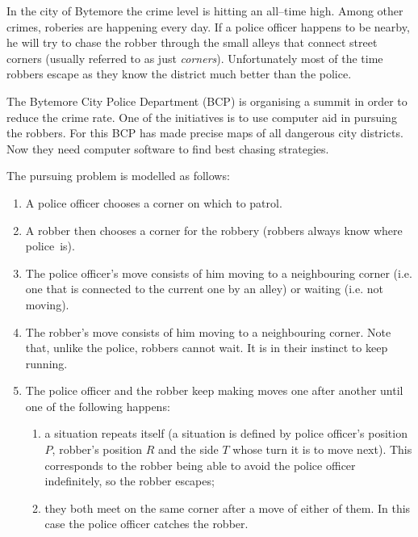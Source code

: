 \documentclass{boi2014}
\begin{document}
    In the city of Bytemore the crime level is hitting an all--time high.  Among
    other crimes, roberies are happening every day.  If a police officer happens
    to be nearby, he will try to chase the robber through the small alleys that
    connect street corners (usually referred to as just \emph{corners}).
    Unfortunately most of the time robbers escape as they know the district much
    better than the police.

    The Bytemore City Police Department (BCP) is organising a summit in order to
    reduce the crime rate. One of the initiatives is to use computer aid in
    pursuing the robbers. For this BCP has made precise maps of all dangerous
    city districts. Now they need computer software to find best chasing
    strategies.

    The pursuing problem is modelled as follows:
    \begin{enumerate}
        \item A police officer chooses a corner on which to patrol.
        \item A robber then chooses a corner for the robbery (robbers always
        know where police~is).
        \item The police officer's move consists of him moving to a neighbouring
        corner (i.e. one that is connected to the current one by an alley) or
        waiting (i.e. not moving).
        \item The robber's move consists of him moving to a neighbouring corner.
        Note that, unlike the police, robbers cannot wait. It is in
        their instinct to keep running.
        \item The police officer and the robber keep making moves one after
        another until one of the following happens:
        \begin{enumerate}
            \item a situation repeats itself (a situation is defined by police
            officer's position $P$, robber's position $R$ and the side $T$ whose
            turn it is to move next). This corresponds to the robber being able
            to avoid the police officer indefinitely, so the robber escapes;
            \item they both meet on the same corner after a move of either of
            them. In this case the police officer catches the robber.
        \end{enumerate}
    \end{enumerate}
\end{document}
